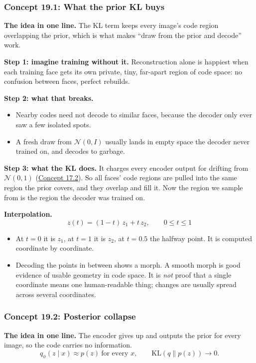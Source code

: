 \documentclass[12pt,a4paper]{article}
\begin{document}
\subsubsection{Concept 19.1: What the prior KL buys}\label{c19-1}

\textbf{The idea in one line.} The KL term keeps every image's code region overlapping the prior, which is what makes ``draw from the prior and decode'' work.

\textbf{Step 1: imagine training without it.} Reconstruction alone is happiest when each training face gets its own private, tiny, far-apart region of code space: no confusion between faces, perfect rebuilds.

\textbf{Step 2: what that breaks.}
\begin{itemize}[nosep]
  \item Nearby codes need not decode to similar faces, because the decoder only ever saw a few isolated spots.
  \item A fresh draw from $\mathcal{N}(0,I)$ usually lands in empty space the decoder never trained on, and decodes to garbage.
\end{itemize}

\textbf{Step 3: what the KL does.} It charges every encoder output for drifting from $\mathcal{N}(0,1)$ (\hyperref[c17-2]{Concept 17.2}). So all faces' code regions are pulled into the same region the prior covers, and they overlap and fill it. Now the region we sample from is the region the decoder was trained on.

\textbf{Interpolation.}
\[
z(t)=(1-t)\,z_1+t\,z_2,\qquad0\le t\le1
\]
\begin{itemize}[nosep]
  \item At $t=0$ it is $z_1$, at $t=1$ it is $z_2$, at $t=0.5$ the halfway point. It is computed coordinate by coordinate.
  \item Decoding the points in between shows a morph. A smooth morph is good evidence of usable geometry in code space. It is \emph{not} proof that a single coordinate means one human-readable thing; changes are usually spread across several coordinates.
\end{itemize}

\subsubsection{Concept 19.2: Posterior collapse}\label{c19-2}

\textbf{The idea in one line.} The encoder gives up and outputs the prior for every image, so the code carries no information.
\[
q_\phi(z\mid x)\approx p(z)\ \text{for every }x,\qquad\mathrm{KL}(q\|p(z))\to0 .
\]
\end{document}
